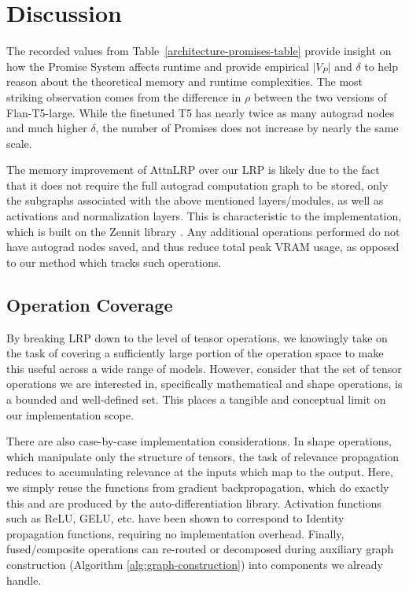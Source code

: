 \documentclass{article}
\begin{document}
\section{Discussion}
The recorded values from Table~\ref{architecture-promises-table} provide insight on how the Promise System affects runtime and provide
empirical $|V_P|$ and $\delta$ to help reason about the theoretical memory and runtime complexities.
The most striking observation comes from the difference in $\rho$ between the two versions of Flan-T5-large. While the finetuned T5 has
nearly twice as many autograd nodes and much higher $\delta$, the number of Promises does not increase by nearly the same scale.

The memory improvement of AttnLRP over our LRP is likely due to the fact that it does not require the full autograd
computation graph to be stored, only the subgraphs associated with the above mentioned layers/modules, as well as activations
and normalization layers. This is characteristic to the implementation, which is built on the Zennit library \cite{anders2021zennit}.
Any additional operations performed do not have autograd nodes saved, and thus reduce total peak VRAM usage, as opposed to our method which tracks such operations.

\subsection{Operation Coverage}

By breaking LRP down to the level of tensor operations, we knowingly take on the task of covering a sufficiently large portion of the operation space to make this useful across a wide range of models.
However, consider that the set of tensor operations we are interested in, specifically mathematical and shape operations, is a bounded and well-defined set. 
This places a tangible and conceptual limit on our implementation scope.

There are also case-by-case implementation considerations.
In shape operations, which manipulate only the structure of tensors, the task of relevance propagation reduces to accumulating relevance at the
inputs which map to the output. Here, we simply reuse the functions from gradient backpropagation, which do exactly this and are produced by the auto-differentiation library.
Activation functions such as ReLU, GELU, etc. have been shown to correspond to Identity propagation functions, requiring no implementation overhead.
Finally, fused/composite operations can re-routed or decomposed during auxiliary graph construction (Algorithm \ref{alg:graph-construction}) into
components we already handle.
\end{document}
